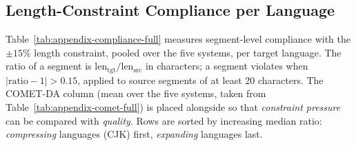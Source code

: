 \subsection{Length-Constraint Compliance per Language}
\label{app:compliance}

Table~\ref{tab:appendix-compliance-full} measures segment-level compliance with
the $\pm15\%$ length constraint, pooled over the five systems, per target
language. The ratio of a segment is
$\text{len}_{\text{tgt}}/\text{len}_{\text{src}}$ in characters; a segment
violates when $|\text{ratio}-1| > 0.15$, applied to source segments of at least
20 characters. The COMET-DA column (mean over the five systems, taken from
Table~\ref{tab:appendix-comet-full}) is placed alongside so that
\emph{constraint pressure} can be compared with \emph{quality}. Rows are sorted
by increasing median ratio: \emph{compressing} languages (CJK) first,
\emph{expanding} languages last.

